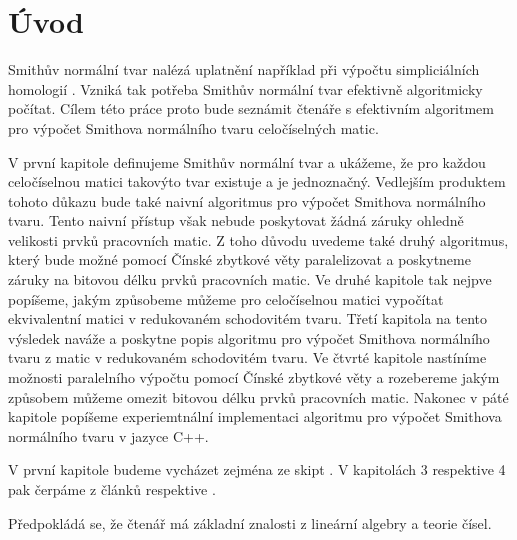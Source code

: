 \chapter*{Úvod}

Smithův normální tvar nalézá uplatnění například při výpočtu simpliciálních
homologií \cite{Simplic_Homo}. Vzniká tak potřeba Smithův normální tvar efektivně
algoritmicky počítat. Cílem této práce proto bude seznámit čtenáře s efektivním
algoritmem pro výpočet Smithova normálního tvaru celočíselných matic.

V první kapitole definujeme Smithův normální tvar a ukážeme, že pro každou
celočíselnou matici takovýto tvar existuje a je jednoznačný. Vedlejším produktem
tohoto důkazu bude také naivní algoritmus pro výpočet Smithova normálního tvaru.
Tento naivní přístup však nebude poskytovat žádná záruky ohledně velikosti prvků
pracovních matic. Z toho důvodu uvedeme také druhý algoritmus, který
bude možné pomocí Čínské zbytkové věty paralelizovat a poskytneme záruky na
bitovou délku prvků pracovních matic.
Ve druhé kapitole tak nejpve popíšeme, jakým způsobeme můžeme pro celočíselnou matici
vypočítat ekvivalentní matici v redukovaném schodovitém tvaru. Třetí kapitola
na tento výsledek naváže a poskytne popis algoritmu pro výpočet Smithova
normálního tvaru z matic v redukovaném schodovitém tvaru. Ve čtvrté kapitole
nastíníme možnosti paralelního výpočtu pomocí Čínské zbytkové věty a rozebereme
jakým způsobem můžeme omezit bitovou délku prvků pracovních matic.
Nakonec v páté kapitole popíšeme experiemtnální implementaci algoritmu pro
výpočet Smithova normálního tvaru v jazyce C++.

V první kapitole budeme vycházet zejména ze skipt \cite{vokr}. V kapitolách
3 respektive 4 pak čerpáme z článků \cite{triang} respektive \cite{SNF_Arne}.

Předpokládá se, že čtenář má základní znalosti z lineární algebry a teorie čísel.

\cleardoublepage

